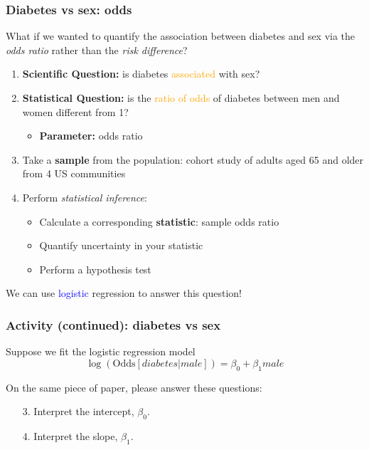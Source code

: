 \documentclass[12pt, 
hyperref={colorlinks=true, linkcolor=blue, urlcolor=cyan}]{beamer}
\begin{document}
\begin{frame}
\frametitle{Diabetes vs sex: odds}
\begin{small} What if we wanted to quantify the association between diabetes and sex via the \textit{odds ratio} rather than the \textit{risk difference}? \end{small} \pause

\vspace{-0.3cm}

\begin{enumerate}
\item \textbf{Scientific Question:} is diabetes \textcolor{orange}{associated} with sex? \pause
\item \textbf{Statistical Question:} is the \textcolor{orange}{ratio of odds} of diabetes between men and women different from 1? \pause
	\begin{itemize}
	\item \textbf{Parameter:} odds ratio \pause
	\end{itemize}
\item Take a \textbf{sample} from the population: cohort study of adults aged 65 and older from 4 US communities \pause
\item Perform \textit{statistical inference}:
	\begin{itemize}
	\item Calculate a corresponding \textbf{statistic}: sample odds ratio
	\item Quantify uncertainty in your statistic
	\item Perform a hypothesis test \pause
	\end{itemize}
\end{enumerate}

\vspace{-0.4cm}
We can use \textcolor{blue}{logistic} regression to answer this question!
\end{frame}

\begin{frame}
\frametitle{Activity (continued): diabetes vs sex}
Suppose we fit the logistic regression model $$\log\left(\text{Odds}[diabetes | male]\right) = \beta_0 + \beta_1 male$$

\color{blue} On the same piece of paper, please answer these questions:

\begin{enumerate}
\item[3.] \color{blue} Interpret the intercept, $\beta_0$.
\item[4.] Interpret the slope, $\beta_1$.
\end{enumerate}
\end{frame}
\end{document}
